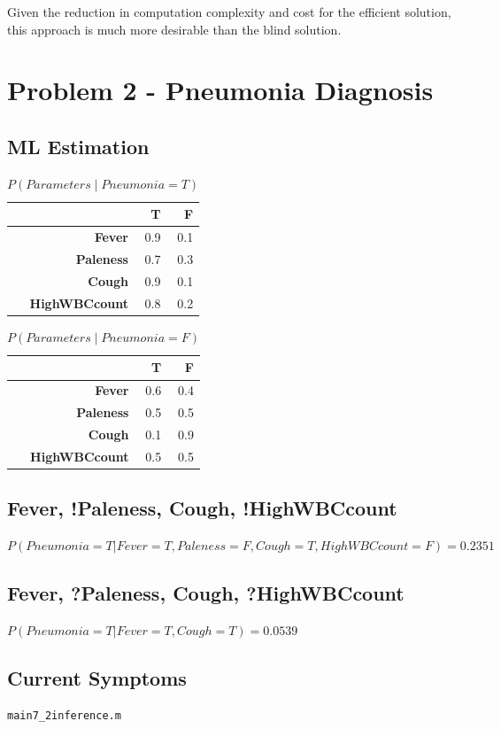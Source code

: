 \documentclass[12pt, letterpaper]{report}
\begin{document}
Given the reduction in computation complexity and cost for the efficient solution, this approach is much more desirable than the blind solution.


\section{Problem 2 - Pneumonia Diagnosis}

\subsection{ML Estimation}

\begin{table}[H]
	\centering
	\begin{tabular}{ |r|r|r| }
		\hline
		& \textbf{T} & \textbf{F} \\
		\hline
		\textbf{Fever} & 0.9 & 0.1 \\
		\hline
		\textbf{Paleness} & 0.7 & 0.3 \\
		\hline
		\textbf{Cough} & 0.9 & 0.1 \\
		\hline
		\textbf{HighWBCcount} & 0.8 & 0.2 \\
		\hline
	\end{tabular}
	\caption{$P(Parameters \mid Pneumonia = T)$}
\end{table}


\begin{table}[H]
	\centering
	\begin{tabular}{ |r|r|r| }
		\hline
		& \textbf{T} & \textbf{F} \\
		\hline
		\textbf{Fever} & 0.6 & 0.4 \\
		\hline
		\textbf{Paleness} & 0.5 & 0.5 \\
		\hline
		\textbf{Cough} & 0.1 & 0.9 \\
		\hline
		\textbf{HighWBCcount} & 0.5 & 0.5 \\
		\hline
	\end{tabular}
	\caption{$P(Parameters \mid Pneumonia = F)$}
\end{table}


\subsection{Fever, !Paleness, Cough, !HighWBCcount}

$P(Pneumonia = T | Fever = T,Paleness = F,Cough = T,HighWBCcount = F) = 0.2351$

\subsection{Fever, ?Paleness, Cough, ?HighWBCcount}

$P(Pneumonia = T | Fever = T,Cough = T) = 0.0539$

\subsection{Current Symptoms}

\begin{verbatim}
main7_2inference.m
\end{verbatim}
\end{document}
